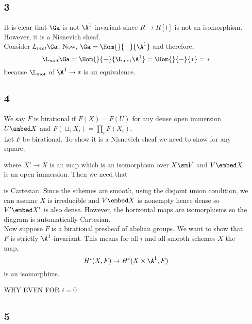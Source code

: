 \documentclass{article}
\begin{document}
\subsection{3}

It is clear that $\Ga$ is not $\A^1$-invariant since $R \to R[t]$ is not an isomorphism. However, it is a Nisnevich sheaf.
\bigskip\\
Consider $L_{mot} \Ga$. Now, $\Ga = \Hom{}{-}{\A^1}$ and therefore,
\[ \L_{mot} \Ga = \Hom{}{-}{\L_{\mot} \A^1} = \Hom{}{-}{*} = * \]
because $\L_{\mot}$ of $\A^1 \to *$ is an equivalence. 

\subsection{4}

We say $F$ is birational if $F(X) = F(U)$ for any dense open immersion $U \embed X$ and $F(\sqcup_i X_i) = \prod_i F(X_i)$.
\bigskip\\
Let $F$ be birational. To show it is a Nisnevich sheaf we need to show for any square,
\begin{center}
\end{center}
where $X' \to X$ is an \etale map which is an isomorphism over $X \sm V$ and $V \embed X$ is an open immersion. Then we need that
\begin{center}
\end{center}
is Cartesian. Since the schemes are smooth, using the disjoint union condition, we can assume $X$ is irreducible and $V \embed X$ is nonempty hence dense so $V' \embed X'$ is also dense. However, the horizontal maps are isomorphisms so the diagram is automatically Cartesian. 
\bigskip\\
Now suppose $F$ is a birational presheaf of abelian groups. We want to show that $F$ is strictly $\A^1$-invariant. This means for all $i$ and all smooth schemes $X$ the map,
\[ H^i(X, F) \to H^i(X \times \A^1, F) \]
is an isomorphims.

{\color{red} WHY EVEN FOR $i = 0$}

\subsection{5}
\end{document}
